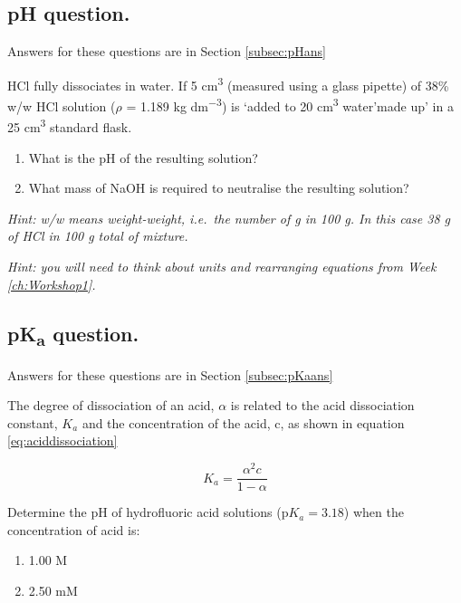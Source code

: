 \documentclass[
]{book}
\providecommand{\tightlist}{%
  \setlength{\itemsep}{0pt}\setlength{\parskip}{0pt}}
\begin{document}
\hypertarget{sec:pH}{%
\subsection{pH question.}\label{sec:pH}}

Answers for these questions are in Section \ref{subsec:pHans}

HCl fully dissociates in water. If 5 cm\textsuperscript{3} (measured using a glass pipette) of 38\% w/w HCl solution (\(\rho\) = 1.189 kg dm\textsuperscript{−3}) is `added to 20 cm\textsuperscript{3} water'made up' in a 25 cm\textsuperscript{3} standard flask.

\begin{enumerate}
\def\labelenumi{\alph{enumi}.}
\tightlist
\item
  What is the pH of the resulting solution?
\item
  What mass of NaOH is required to neutralise the resulting solution?
\end{enumerate}

\emph{Hint: w/w means weight-weight, i.e.~the number of g in 100 g. In this case 38 g of HCl in 100 g total of mixture.}

\emph{Hint: you will need to think about units and rearranging equations from Week \ref{ch:Workshop1}.}

\hypertarget{sec:pKa}{%
\subsection{\texorpdfstring{pK\textsubscript{a} question.}{pKa question.}}\label{sec:pKa}}

Answers for these questions are in Section \ref{subsec:pKaans}

The degree of dissociation of an acid, \(\alpha\) is related to the acid dissociation constant, \(K_a\) and the concentration of the acid, c, as shown in equation \eqref{eq:aciddissociation}

\begin{equation}
K_a=\frac{\alpha ^2 c}{1-\alpha}
\label{eq:aciddissociation}
\end{equation}

Determine the pH of hydrofluoric acid solutions (p\(K_a= 3.18\)) when the concentration of acid is:

\begin{enumerate}
\def\labelenumi{\alph{enumi}.}
\tightlist
\item
  1.00 M
\item
  2.50 mM
\end{enumerate}
\end{document}
